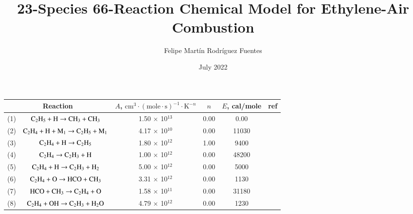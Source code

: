 \documentclass{warpdoc}
\author{
  Felipe Martín Rodríguez Fuentes
}
\title{23-Species 66-Reaction Chemical Model for Ethylene-Air
Combustion
}
\date{
  July 2022
}
\renewcommand{\fontsizetable}{\footnotesize\scalefont{0.9}}
\begin{document}
  \pagestyle{headings}
  \setcounter{page}{1}
  \makewarpdoctitle



\begin{table}[h]
\fontsizetable
\begin{center}
\begin{threeparttable}
\begin{tabular}{cccccc} 
\toprule
\multicolumn{2}{c}{Reaction \tnote{d}} & $A$, $\textrm{cm}^3\cdot(\textrm{mole}\cdot \textrm{s})^{-1}\cdot \textrm{K}^{-n}$ & $n$ & $E$, cal/mole & ref \\ 
\midrule
(1) & $\rm C_2 H_5 + H \rightarrow CH_3 + CH_3$  & 1.50 $\times$ 10$^{13}$  & 0.00 & 0.00  & \cite{pci:2015:saghafian}\\

(2) & $\rm C_2 H_4 + H + M_1\rightarrow C_2 H_5 + M_1$  & 4.17 $\times$ 10$^{10}$  & 0.00 & 11030&\cite{pci:2015:saghafian}\tnote{a}\\

(3) & $\rm C_2 H_4 + H\rightarrow C_2 H_5 $ & 1.80 $\times$ 10$^{12}$  & 1.00 & 9400 &\cite{ef:2017:zettervall}\\

(4) & $\rm C_2 H_4\rightarrow C_2 H_3 +H $ & 1.00 $\times$ 10$^{12}$  & 0.00 & 48200 &\cite{ef:2017:zettervall}\\

(5) & $\rm C_2 H_4 + H \rightarrow C_2 H_3 +H_2 $ & 5.00 $\times$ 10$^{12}$  & 0.00 & 5000 &\cite{ef:2017:zettervall}\\

(6) & $\rm C_2 H_4 + O \rightarrow HCO + CH_3$ & 3.31 $\times$ 10$^{12}$  & 0.00 & 1130 & \cite{caf:1989:refael}\\

(7) & $\rm HCO + CH_3 \rightarrow C_2 H_4 + O$ & 1.58 $\times$ 10$^{11}$  & 0.00 & 31180 &\cite{caf:1989:refael}\\

(8) & $\rm C_2 H_4 + OH \rightarrow C_2 H_3 + H_2 O$ & 4.79 $\times$ 10$^{12}$  & 0.00 & 1230 &\cite{caf:1989:refael}\\


\end{tabular}
\end{threeparttable}
\end{center}
\end{table}
\end{document}
